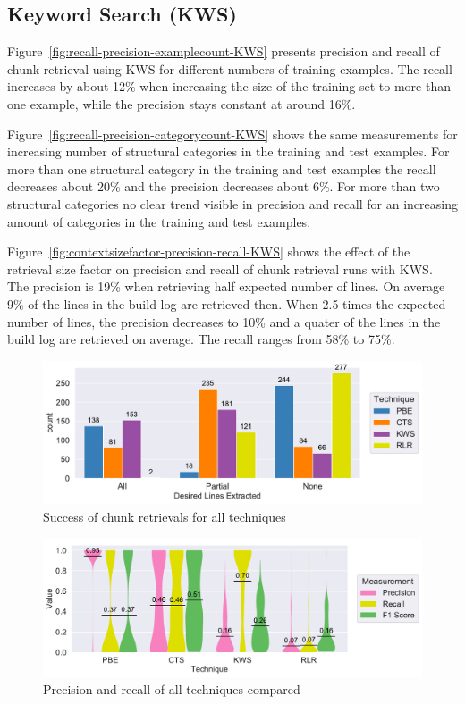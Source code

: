 \documentclass[\myrootdir/main.tex]{subfiles}
\begin{document}
\subsection{Keyword Search (KWS)}
Figure~\ref{fig:recall-precision-examplecount-KWS} presents precision and recall of chunk retrieval using KWS for different numbers of training examples.
The recall increases by about 12\% when increasing the size of the training set to more than one example, while the precision stays constant at around 16\%.

Figure~\ref{fig:recall-precision-categorycount-KWS} shows the same measurements for increasing number of structural categories in the training and test examples.
For more than one structural category in the training and test examples the recall decreases about 20\% and the precision decreases about 6\%.
For more than two structural categories no clear trend visible in precision and recall for an increasing amount of categories in the training and test examples.

Figure~\ref{fig:contextsizefactor-precision-recall-KWS} shows the effect of the retrieval size factor on precision and recall of chunk retrieval runs with KWS\@.
The precision is 19\% when retrieving half expected number of lines. On average 9\% of the lines in the build log are retrieved then.
When 2.5 times the expected number of lines, the precision decreases to 10\% and a quater of the lines in the build log are retrieved on average.
The recall ranges from 58\% to 75\%.

\begin{figure}[htbp]
		\centering
		\includegraphics[width=\textwidth, clip]{img/big-study/success-partial-all.pdf}
		\caption{Success of chunk retrievals for all techniques}
		\label{fig:success-partial-all}
\end{figure}

\begin{figure}[htbp]
		\centering
		\includegraphics[width=\textwidth, clip]{img/big-study/recall-precision-all.pdf}
		\caption{Precision and recall of all techniques compared}
		\label{fig:recall-precision-all}
\end{figure}
\end{document}
